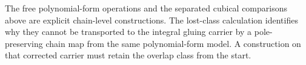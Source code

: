 The free polynomial-form operations and the separated cubical
comparisons above are explicit chain-level constructions.
The lost-class calculation identifies why they cannot be transported
to the integral gluing carrier by a pole-preserving chain map from
the same polynomial-form model.  A construction on that corrected
carrier must retain the overlap class from the start.
